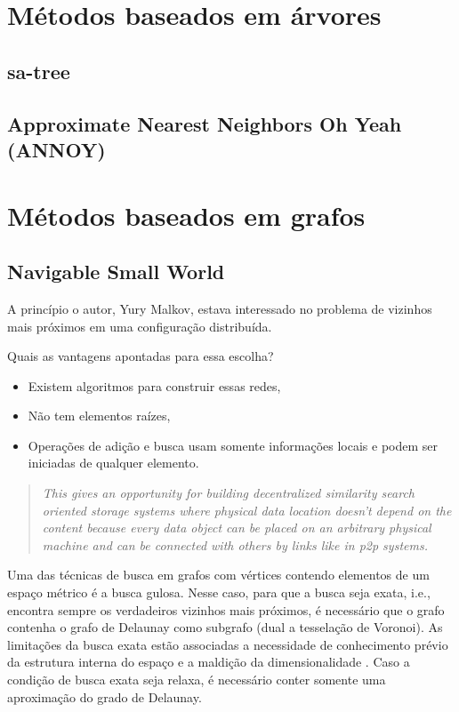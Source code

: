 \section{Métodos baseados em árvores}

\subsection{sa-tree}

\subsection{Approximate Nearest Neighbors Oh Yeah (ANNOY)}

\section{Métodos baseados em grafos}

\subsection{Navigable Small World}

A princípio\cite{scalable:malkov2012,smallworldgraphs:malkov2014} o autor, Yury Malkov, estava interessado no problema de vizinhos mais próximos em uma configuração distribuída.

Quais as vantagens apontadas para essa escolha?
\begin{itemize}
    \item Existem algoritmos para construir essas redes,
    \item Não tem elementos raízes,
    \item Operações de adição e busca usam somente informações locais e podem ser iniciadas de qualquer elemento.
\end{itemize}

\begin{quotation}
    \it This gives an opportunity for building decentralized similarity search oriented storage
    systems where physical data location doesn't depend on the content because every
    data object can be placed on an arbitrary physical machine and can be connected with
    others by links like in p2p systems.
\end{quotation}

Uma das técnicas de busca em grafos com vértices contendo elementos de um espaço métrico é a busca gulosa. Nesse caso, para que a busca seja exata, i.e., encontra sempre os verdadeiros vizinhos mais próximos, é necessário que o grafo contenha o grafo de Delaunay como subgrafo ({\color{purple}dual a tesselação de Voronoi}). As limitações da busca exata estão associadas a necessidade de conhecimento prévio da estrutura interna do espaço\cite{searching:navarro2002} e a maldição da dimensionalidade \cite{voronoi:aurenhammer1991}. Caso a condição de busca exata seja relaxa, é necessário conter somente uma aproximação do grado de Delaunay.

